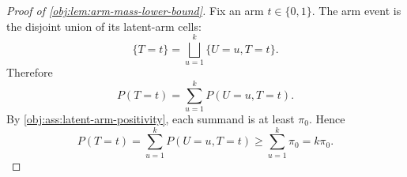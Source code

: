 \begin{proof}[Proof of \cref{obj:lem:arm-mass-lower-bound}]
Fix an arm \(t\in\{0,1\}\). The arm event is the disjoint union of its latent-arm cells:
\[
\{T=t\}=\bigsqcup_{u=1}^k \{U=u,T=t\}.
\]
Therefore
\[
P(T=t)=\sum_{u=1}^k P(U=u,T=t).
\] %
By \cref{obj:ass:latent-arm-positivity}, each summand is at least \(\pi_0\). Hence
\[
P(T=t)
=\sum_{u=1}^k P(U=u,T=t)
\ge \sum_{u=1}^k \pi_0
=k\pi_0 .
\] %
\end{proof}
